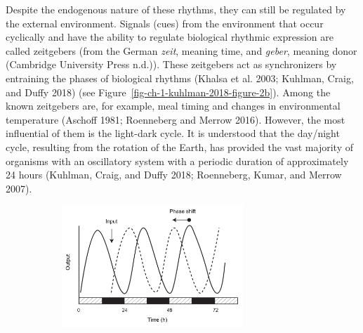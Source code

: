 \documentclass[
  12pt,
  a4paper,
  oneside]{tesesusp}
\begin{document}
Despite the endogenous nature of these rhythms, they can still be
regulated by the external environment. Signals (cues) from the
environment that occur cyclically and have the ability to regulate
biological rhythmic expression are called zeitgebers (from the German
\emph{zeit}, meaning time, and \emph{geber}, meaning donor (Cambridge
University Press n.d.)). These zeitgebers act as synchronizers by
entraining the phases of biological rhythms (Khalsa et al. 2003;
Kuhlman, Craig, and Duffy 2018) (see
Figure~\ref{fig-ch-1-kuhlman-2018-figure-2b}). Among the known
zeitgebers are, for example, meal timing and changes in environmental
temperature (Aschoff 1981; Roenneberg and Merrow 2016). However, the
most influential of them is the light-dark cycle. It is understood that
the day/night cycle, resulting from the rotation of the Earth, has
provided the vast majority of organisms with an oscillatory system with
a periodic duration of approximately 24 hours (Kuhlman, Craig, and Duffy
2018; Roenneberg, Kumar, and Merrow 2007).

\vspace{5pt}

\begin{figure}

\caption{\label{fig-ch-1-kuhlman-2018-figure-2b}Illustration of a
circadian rhythm (output) whose phase is entrained in the presence of a
zeitgeber (input). The rectangles represent the light-dark cycle.\\
Adaptation based on Kuhlman, Craig, and Duffy (2018).}

{\centering 

\begin{figure}[H]

{\centering \includegraphics[width=0.75\textwidth,height=\textheight]{images/kuhlman-2018-figure-2b.jpg}

}

\end{figure}

}

\end{figure}
\end{document}
